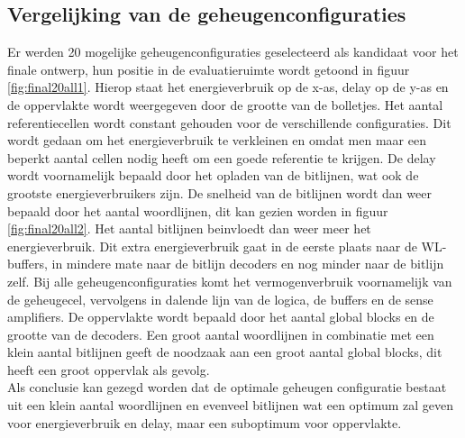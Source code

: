 \subsection{Vergelijking van de geheugenconfiguraties}
Er werden 20 mogelijke geheugenconfiguraties geselecteerd als kandidaat voor het finale ontwerp, hun positie in de evaluatieruimte wordt getoond in figuur \ref{fig:final20all1}. Hierop staat het energieverbruik op de x-as, delay op de y-as en de oppervlakte wordt weergegeven door de grootte van de bolletjes. Het aantal referentiecellen wordt constant gehouden voor de verschillende configuraties. Dit wordt gedaan om het energieverbruik te verkleinen en omdat men maar een beperkt aantal cellen nodig heeft om een goede referentie te krijgen. De delay wordt voornamelijk bepaald door het opladen van de bitlijnen, wat ook de grootste energieverbruikers zijn. De snelheid van de bitlijnen wordt dan weer bepaald door het aantal woordlijnen, dit kan gezien worden in figuur \ref{fig:final20all2}. Het aantal bitlijnen beinvloedt dan weer meer het energieverbruik. Dit extra energieverbruik gaat in de eerste plaats naar de WL-buffers, in mindere mate naar de bitlijn decoders en nog minder naar de bitlijn zelf. Bij alle geheugenconfiguraties komt het vermogenverbruik voornamelijk van de geheugecel, vervolgens in dalende lijn van de logica, de buffers en de sense amplifiers. De oppervlakte wordt bepaald door het aantal global blocks en de grootte van de decoders. Een groot aantal woordlijnen in combinatie met een klein aantal bitlijnen geeft de noodzaak aan een groot aantal global blocks, dit heeft een groot oppervlak als gevolg.\\
Als conclusie kan gezegd worden dat de optimale geheugen configuratie bestaat uit een klein aantal woordlijnen en evenveel bitlijnen wat een optimum zal geven voor energieverbruik en delay, maar een suboptimum voor oppervlakte.



